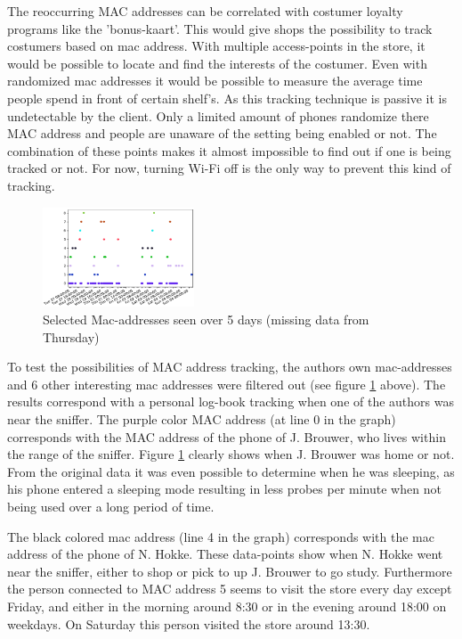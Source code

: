 \documentclass[conference,compsoc]{IEEEtran}
\begin{document}
The reoccurring MAC addresses can be correlated with costumer loyalty programs like the 'bonus-kaart'. This would give shops the possibility to track costumers based on mac address. With multiple access-points in the store, it would be possible to locate and find the interests of the costumer. Even with randomized mac addresses it would be possible to measure the average time people spend in front of certain shelf's. As this tracking technique is passive it is undetectable by the client. Only a limited amount of phones randomize there MAC address and people are unaware of the setting being enabled or not. The combination of these points makes it almost impossible to find out if one is being tracked or not. For now, turning Wi-Fi off is the only way to prevent this kind of tracking. 

\begin{figure}[h!]
    \centering
    \includegraphics[width=0.4\textwidth]{img/selectedmac.png} 
    \caption{Selected Mac-addresses seen over 5 days (missing data from Thursday)}
    \label{fig:selected}
\end{figure}

To test the possibilities of MAC address tracking, the authors own mac-addresses and 6 other interesting mac addresses were filtered out (see figure \ref{fig:selected} above). The results correspond with a personal log-book tracking when one of the authors was near the sniffer. The purple color MAC address (at line 0 in the graph) corresponds with the MAC address of the phone of J. Brouwer, who lives within the range of the sniffer. Figure \ref{fig:selected} clearly shows when J. Brouwer was home or not. From the original data it was even possible to determine when he was sleeping, as his phone entered a sleeping mode resulting in less probes per minute when not being used over a long period of time.

The black colored mac address (line 4 in the graph) corresponds with the mac address of the phone of N. Hokke. These data-points show when N. Hokke went near the sniffer, either to shop or pick to up J. Brouwer to go study. Furthermore the person connected to MAC address 5 seems to visit the store every day except Friday, and either in the morning around 8:30 or in the evening around 18:00 on weekdays. On Saturday this person visited the store around 13:30. 
\end{document}

